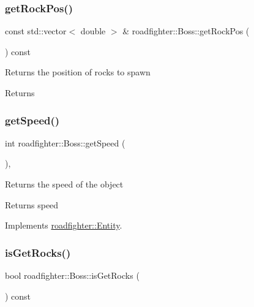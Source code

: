 \subsubsection{\texorpdfstring{get\+Rock\+Pos()}{getRockPos()}}
{\footnotesize\ttfamily const std\+::vector$<$ double $>$ \& roadfighter\+::\+Boss\+::get\+Rock\+Pos (\begin{DoxyParamCaption}{ }\end{DoxyParamCaption}) const}

Returns the position of rocks to spawn \begin{DoxyReturn}{Returns}

\end{DoxyReturn}
\mbox{\label{classroadfighter_1_1Boss_a348151aa9aabb3baabf9a8cc0b6955cb}} 
\subsubsection{\texorpdfstring{get\+Speed()}{getSpeed()}}
{\footnotesize\ttfamily int roadfighter\+::\+Boss\+::get\+Speed (\begin{DoxyParamCaption}{ }\end{DoxyParamCaption})\hspace{0.3cm}{\ttfamily [override]}, {\ttfamily [virtual]}}

Returns the speed of the object \begin{DoxyReturn}{Returns}
speed 
\end{DoxyReturn}


Implements \hyperlink{classroadfighter_1_1Entity_ad3760184d764a61922e1db7d98501ee4}{roadfighter\+::\+Entity}.

\mbox{\label{classroadfighter_1_1Boss_a87c3a59c31b8babf464711a69c74622d}} 
\subsubsection{\texorpdfstring{is\+Get\+Rocks()}{isGetRocks()}}
{\footnotesize\ttfamily bool roadfighter\+::\+Boss\+::is\+Get\+Rocks (\begin{DoxyParamCaption}{ }\end{DoxyParamCaption}) const}


